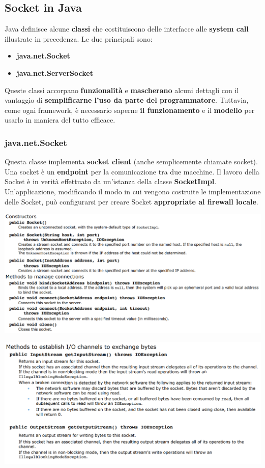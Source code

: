 \documentclass[12pt]{article}
\begin{document}
\subsection{Socket in Java}
Java definisce alcune \textbf{classi} che costituiscono delle interfacce alle \textbf{system call} illustrate in precedenza. Le due principali sono:
\begin{itemize}
    \item \textbf{java.net.Socket}
    \item \textbf{java.net.ServerSocket}
\end{itemize}
Queste classi accorpano \textbf{funzionalità} e \textbf{mascherano} alcuni dettagli con il vantaggio di \textbf{semplificarne l'uso da parte del programmatore}. Tuttavia, come ogni framework, è necessario saperne \textbf{il funzionamento} e il \textbf{modello} per usarlo in maniera del tutto efficace.
\subsubsection{java.net.Socket}
Questa classe implementa \textbf{socket client} (anche semplicemente chiamate socket). Una socket è un \textbf{endpoint} per la comunicazione tra due macchine. Il lavoro della Socket è in verità effettuato da un'istanza della classe \textbf{SocketImpl}. Un'applicazione, modificando il modo in cui vengono costruite le implementazione delle Socket, può configurarsi per creare Socket \textbf{appropriate al firewall locale}.
\begin{center}
    \includegraphics[width = 1.15\textwidth]{Images/31.PNG}
\end{center}
\begin{center}
    \includegraphics[width = 1.15\textwidth]{Images/32.PNG}
\end{center}
\end{document}
